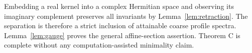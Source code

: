 Embedding a real kernel into a complex Hermitian space and observing its imaginary complement preserves all invariants by Lemma~\ref{lem:retraction}. The separation is therefore a strict inclusion of attainable coarse profile spectra. Lemma~\ref{lem:gauge} proves the general affine-section assertion. Theorem C is complete without any computation-assisted minimality claim.

